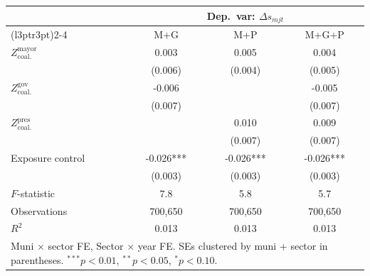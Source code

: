 \begin{tabular}[t]{lccc}
\toprule
\multicolumn{1}{c}{\textbf{ }} & \multicolumn{3}{c}{\textbf{Dep.~var: $\Delta s_{mjt}$}} \\
\cmidrule(l{3pt}r{3pt}){2-4}
  & M+G & M+P & M+G+P\\
\midrule
$Z^{\text{mayor}}_{\text{coal.}}$ & 0.003 & 0.005 & 0.004\\
 & (0.006) & (0.004) & (0.005)\\
$Z^{\text{gov}}_{\text{coal.}}$ & -0.006 &  & -0.005\\
 & (0.007) &  & (0.007)\\
$Z^{\text{pres}}_{\text{coal.}}$ &  & 0.010 & 0.009\\
 &  & (0.007) & (0.007)\\
Exposure control & -0.026*** & -0.026*** & -0.026***\\
 & (0.003) & (0.003) & (0.003)\\
\midrule
$F$-statistic & 7.8 & 5.8 & 5.7\\
Observations & 700,650 & 700,650 & 700,650\\
$R^2$ & 0.013 & 0.013 & 0.013\\
\bottomrule
\multicolumn{4}{l}{\rule{0pt}{1em}Muni $\times$ sector FE, Sector $\times$ year FE. SEs clustered by muni + sector in parentheses. $^{***}p<0.01$, $^{**}p<0.05$, $^{*}p<0.10$.}\\
\end{tabular}
